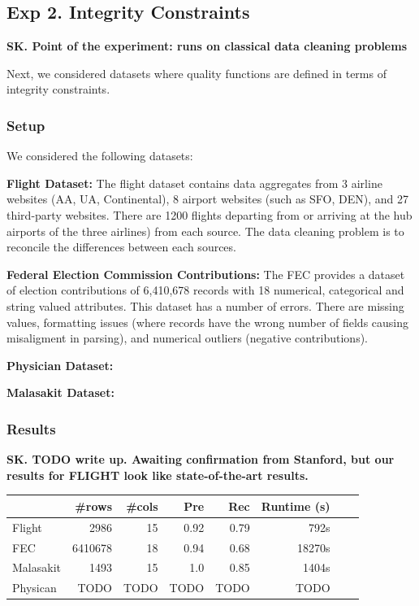 
\subsection*{Exp 2. Integrity Constraints}
\textbf{SK. Point of the experiment: runs on classical data cleaning problems}

Next, we considered datasets where quality functions are defined in terms of integrity constraints.


\subsubsection{Setup}
We considered the following datasets:

\vspace{0.5em}\noindent\textbf{Flight Dataset: } The flight dataset contains data aggregates from 3 airline websites (AA, UA, Continental),
8 airport websites (such as SFO, DEN), and 27 third-party
websites.
There are 1200 flights departing from or arriving at the hub airports of the three airlines) from each source.
The data cleaning problem is to reconcile the differences between each sources.

\vspace{0.5em}\noindent\textbf{Federal Election Commission Contributions: } The FEC provides a dataset of election contributions of 6,410,678 records with 18 numerical, categorical and string valued attributes. This dataset has a number of errors. There are missing values, formatting issues (where records have the wrong number of fields causing misaligment in parsing), and numerical outliers (negative contributions).

\vspace{0.5em}\noindent\textbf{Physician Dataset: }

\vspace{0.5em}\noindent\textbf{Malasakit Dataset: }


 
\subsubsection{Results}

\textbf{SK. TODO write up. Awaiting confirmation from Stanford, but our results for FLIGHT look like state-of-the-art results.}

\begin{table}[ht]
\centering
\begin{tabular}{|l|r|r|r|r|r|r|r|}
\hline
 & \#rows & \#cols & Pre & Rec & Runtime (s) \\
\hline
Flight	&2986&15&0.92&	0.79&	792s\\
\hline
FEC	&6410678&18&0.94&	0.68&	18270s\\
\hline
Malasakit &1493& 15& 1.0 & 0.85& 1404s\\
\hline
Physican	&TODO&TODO&TODO&TODO&TODO\\
\hline
\end{tabular}
\end{table}


